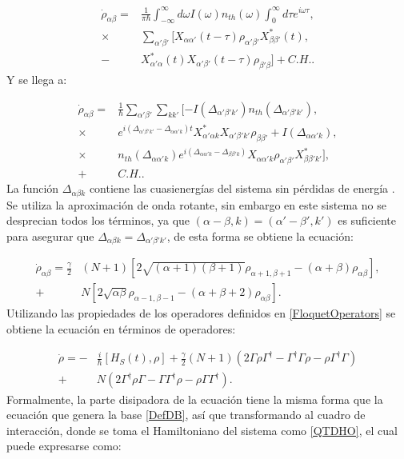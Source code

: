\documentclass[a4paper,10pt]{report}
\begin{document}
\begin{align*}
\dot{\rho}_{\alpha \beta} =& \frac{1}{\pi \hbar} \int_{-\infty}^\infty d\omega I(\omega)n_{th}(\omega) \int_0 ^{\infty} d\tau e^{i\omega \tau}, \\
 \times & \sum_{\alpha' \beta '} [X_{\alpha \alpha'}(t-\tau)\rho_{\alpha' \beta'}X^* _{\beta \beta'}(t),\\
 -& X^* _{\alpha' \alpha}(t) X_{\alpha' \beta'}(t-\tau)\rho_{\beta' \beta}] + C.H..
\end{align*} Y se llega a:

\begin{align*}
\dot{\rho}_{\alpha \beta} =& \frac{1}{\hbar} \sum_{\alpha' \beta'}\sum_{k k'}[-I(\Delta_{\alpha' \beta' k'}) n_{th} (\Delta_{\alpha' \beta' k'}),\\
\times & e^{i(\Delta_{\alpha' \beta' k'}-\Delta_{\alpha \alpha' k})t} X^*_{\alpha' \alpha k}X_{\alpha' \beta' k'}\rho_{\beta \beta'} + I(\Delta_{\alpha \alpha' k}),\\
\times & n_{th}(\Delta_{\alpha \alpha' k}) e^{i(\Delta_{\alpha \alpha' k}-\Delta_{\beta \beta' k})}X_{\alpha \alpha' k} \rho_{\alpha' \beta'}X^*_{\beta \beta' k'}],\\
+& C. H..  
\end{align*} La función $\Delta_{\alpha \beta k}$ contiene las cuasienergías del sistema sin pérdidas de energía \cite{HanngiDQS}. Se utiliza la aproximación de onda rotante, sin embargo en este sistema no se desprecian todos los términos, ya que $(\alpha-\beta,k)=(\alpha'-\beta',k')$ es suficiente para asegurar que $\Delta_{\alpha \beta k}=\Delta_{\alpha' \beta' k'}$, de esta forma se obtiene la ecuación:

\begin{align*}
\dot{\rho}_{\alpha \beta} = \frac{\gamma}{2}&(N+1)[2\sqrt{(\alpha+1)(\beta + 1)}\rho_{\alpha+1,\beta+1} - (\alpha + \beta)\rho_{\alpha \beta}],\\
+& N[2\sqrt{\alpha \beta}\rho_{\alpha-1,\beta-1} - (\alpha + \beta + 2)\rho_{\alpha \beta}].
\end{align*}Utilizando las propiedades de los operadores definidos en \ref{FloquetOperators} se obtiene la ecuación en términos de operadores:

\begin{align*}
\dot{\rho} = -&\frac{i}{\hbar}[H_S (t),\rho] + \frac{\gamma}{2}(N+1)(2\Gamma\rho\Gamma^\dagger - \Gamma^\dagger\Gamma \rho - \rho \Gamma^\dagger \Gamma )\\
 +& N(2\Gamma^\dagger \rho \Gamma - \Gamma \Gamma^\dagger \rho - \rho \Gamma\Gamma^\dagger).
\end{align*} Formalmente, la parte disipadora de la ecuación tiene la misma forma que la ecuación que genera la base \ref{DefDB}, así que transformando al cuadro de interacción, donde se toma el Hamiltoniano del sistema como \ref{QTDHO}, el cual puede expresarse como\cite{BrownPT}:
\end{document}
